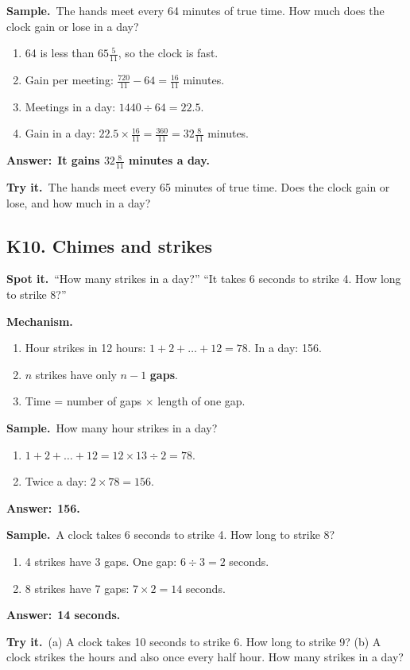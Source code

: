 \documentclass[11pt,a4paper]{article}
\let\oldsubsection\subsection
\renewcommand{\subsection}{\needspace{9\baselineskip}\oldsubsection}
\newcommand{\spot}{\textbf{\color{ember}Spot it.}\ }
\newcommand{\mech}{\textbf{\color{ember}Mechanism.}\ }
\newif\ifkeepsamp
\newcommand{\ans}[1]{\par\nopagebreak\noindent\textbf{\color{ember}Answer:}\ \textbf{#1}\par}
\newcommand{\samp}{\ifkeepsamp\needspace{4\baselineskip}\fi\textbf{\color{ember}Sample.}\ }
\newcommand{\tryit}[1]{\textbf{\color{ember}Try it.}\ #1}
\begin{document}
\samp The hands meet every 64 minutes of true time. How much does the clock gain or lose in a day?
\begin{enumerate}
\item 64 is less than $65\tfrac5{11}$, so the clock is fast.
\item Gain per meeting: $\tfrac{720}{11} - 64 = \tfrac{16}{11}$ minutes.
\item Meetings in a day: $1440 \div 64 = 22.5$.
\item Gain in a day: $22.5 \times \tfrac{16}{11} = \tfrac{360}{11} = 32\tfrac8{11}$ minutes.
\end{enumerate}
\ans{It gains $32\tfrac8{11}$ minutes a day.}

\tryit The hands meet every 65 minutes of true time. Does the clock gain or lose, and how much in a day?

\subsection{K10. Chimes and strikes}
\spot ``How many strikes in a day?'' ``It takes 6 seconds to strike 4. How long to strike 8?''

\mech
\begin{enumerate}
\item Hour strikes in 12 hours: $1 + 2 + \dots + 12 = 78$. In a day: 156.
\item $n$ strikes have only $n - 1$ \textbf{gaps}.
\item Time = number of gaps $\times$ length of one gap.
\end{enumerate}

\samp How many hour strikes in a day?
\begin{enumerate}
\item $1 + 2 + \dots + 12 = 12 \times 13 \div 2 = 78$.
\item Twice a day: $2 \times 78 = 156$.
\end{enumerate}
\ans{156.}

\samp A clock takes 6 seconds to strike 4. How long to strike 8?
\begin{enumerate}
\item 4 strikes have 3 gaps. One gap: $6 \div 3 = 2$ seconds.
\item 8 strikes have 7 gaps: $7 \times 2 = 14$ seconds.
\end{enumerate}
\ans{14 seconds.}

\tryit (a) A clock takes 10 seconds to strike 6. How long to strike 9? (b) A clock strikes the hours and also once every half hour. How many strikes in a day?
\end{document}

